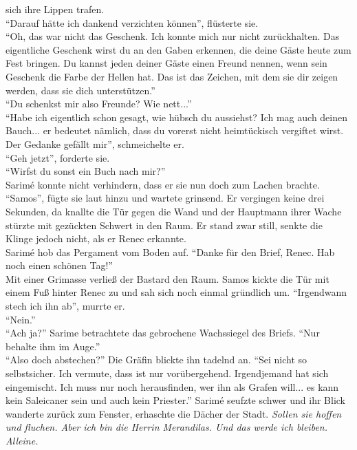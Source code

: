 sich ihre Lippen trafen.\\
``Darauf hätte ich dankend verzichten können'', flüsterte sie.\\
``Oh, das war nicht das Geschenk. Ich konnte mich nur nicht zurückhalten. Das eigentliche Geschenk 
wirst du an den Gaben erkennen, die deine Gäste heute zum Fest bringen. Du kannst jeden deiner Gäste 
einen Freund nennen, wenn sein Geschenk die Farbe der Hellen hat. Das ist das Zeichen, mit dem sie 
dir zeigen werden, dass sie dich unterstützen.''\\
``Du schenkst mir also Freunde? Wie nett...''\\
``Habe ich eigentlich schon gesagt, wie hübsch du aussiehst? Ich mag auch deinen Bauch... er 
bedeutet nämlich, dass du vorerst nicht heimtückisch vergiftet wirst. Der Gedanke gefällt mir'', 
schmeichelte er.\\
``Geh jetzt'', forderte sie.\\
``Wirfst du sonst ein Buch nach mir?''\\
Sarimé konnte nicht verhindern, dass er sie nun doch zum Lachen brachte. ``Samos'', fügte sie laut 
hinzu und wartete grinsend. Er vergingen keine drei Sekunden, da knallte die Tür gegen die Wand und 
der Hauptmann ihrer Wache stürzte mit gezückten Schwert in den Raum. Er stand zwar still, senkte die 
Klinge jedoch nicht, als er Renec erkannte.\\
Sarimé hob das Pergament vom Boden auf. ``Danke für den Brief, Renec. Hab noch einen schönen 
Tag!''\\
Mit einer Grimasse verließ der Bastard den Raum. Samos kickte die Tür mit einem Fuß hinter Renec zu 
und sah sich noch einmal gründlich um. 
``Irgendwann stech ich ihn ab'', murrte er.\\
``Nein.''\\
``Ach ja?''
Sarime betrachtete das gebrochene Wachssiegel des Briefs. ``Nur behalte ihm im Auge.''\\
``Also doch abstechen?''
Die Gräfin blickte ihn tadelnd an. ``Sei nicht so selbstsicher. Ich vermute, dass ist nur 
vorübergehend. Irgendjemand hat sich eingemischt.  Ich muss nur noch herausfinden, wer ihn als 
Grafen will... es kann kein Saleicaner sein und auch kein Priester.'' Sarimé seufzte schwer und ihr 
Blick wanderte zurück zum Fenster, erhaschte die Dächer der Stadt. \textit{Sollen sie hoffen und 
fluchen. Aber ich bin die Herrin Merandilas. Und das werde ich bleiben. Alleine.}

